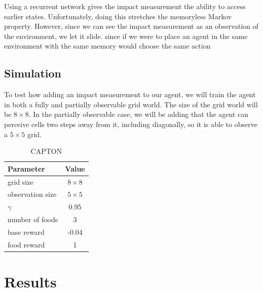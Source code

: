 \documentclass[12pt,A4]{report}
\theoremstyle{definition}
\begin{document}
Using a recurrent network gives the impact measurement the ability to access earlier states. Unfortunately, doing this stretches the memoryless Markov property. However, since we can see the impact measurement as an observation of the environment, we let it slide. since if we were to place an agent in the same environment with the same memory would choose the same action

\section{Simulation}
To test how adding an impact measurement to our agent, we will train the agent in both a fully and partially observable grid world. The size of the grid world will be $8\times8$. In the partially observable case, we will be adding that the agent can perceive cells two steps away from it, including diagonally, so it is able to observe a $5\times5$ grid.

\begin{table}
  \centering
  \begin{tabular}{l | c}
    Parameter& Value \\ \hline
    grid size & $8 \times  8$ \\
    observation size & $5 \times  5$ \\
    $\gamma$ & 0.95 \\
    number of foods & 3 \\
    base reward & -0.04 \\
    food reward & 1 \\
  \end{tabular}
  \caption{CAPTON}
  \label{tab:sim_parms}
\end{table}


\chapter{Results}
\end{document}
